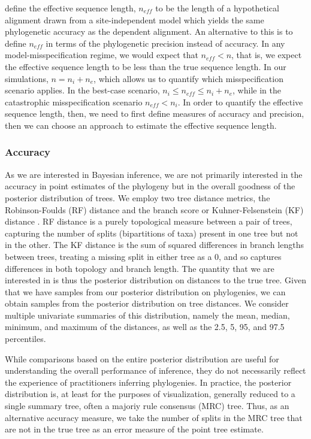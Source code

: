 \documentclass[11pt]{article}
\begin{document}
\citet{nasrallah2011quantifying} define the effective sequence length, $n_{eff}$ to be the length of a hypothetical alignment drawn from a site-independent model which yields the same phylogenetic accuracy as the dependent alignment.
An alternative to this is to define $n_{eff}$ in terms of the phylogenetic precision instead of accuracy.
In any model-misspecification regime, we would expect that $n_{eff} < n$, that is, we expect the effective sequence length to be less than the true sequence length.
In our simulations, $n = n_i + n_e$, which allows us to quantify which misspecification scenario applies.
In the best-case scenario, $n_i \leq n_{eff} \leq n_i + n_e$, while in the catastrophic misspecification scenario $n_{eff} < n_i$.
In order to quantify the effective sequence length, then, we need to first define measures of accuracy and precision, then we can choose an approach to estimate the effective sequence length.



\subsubsection*{Accuracy\label{sec:error}}
As we are interested in Bayesian inference, we are not primarily interested in the accuracy in point estimates of the phylogeny but in the overall goodness of the posterior distribution of trees.
We employ two tree distance metrics, the Robinson-Foulds (RF) distance \citep{robinson1981comparison} and the branch score or Kuhner-Felsenstein (KF) distance \citep{kuhner1994simulation}.
RF distance is a purely topological measure between a pair of trees, capturing the number of splits (bipartitions of taxa) present in one tree but not in the other.
The KF distance is the sum of squared differences in branch lengths between trees, treating a missing split in either tree as a 0, and so captures differences in both topology and branch length.
The quantity that we are interested in is thus the posterior distribution on distances to the true tree.
Given that we have samples from our posterior distribution on phylogenies, we can obtain samples from the posterior distribution on tree distances.
We consider multiple univariate summaries of this distribution, namely the mean, median, minimum, and maximum of the distances, as well as the 2.5, 5, 95, and 97.5 percentiles.

While comparisons based on the entire posterior distribution are useful for understanding the overall performance of inference, they do not necessarily reflect the experience of practitioners inferring phylogenies.
In practice, the posterior distribution is, at least for the purposes of visualization, generally reduced to a single summary tree, often a majoriy rule consensus (MRC) tree.
Thus, as an alternative accuracy measure, we take the number of splits in the MRC tree that are not in the true tree as an error measure of the point tree estimate.
\end{document}
